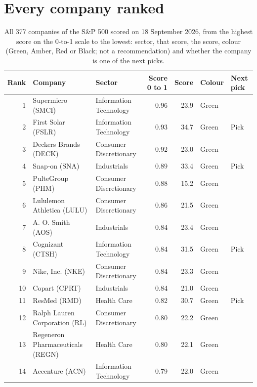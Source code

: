 \documentclass[11pt,a4paper]{article}
\begin{document}
\section{Every company ranked}
\label{app:ranking}
{\small
\begin{longtable}{r p{4.4cm} p{2.8cm} r r l l}
\caption{All 377 companies of the S\&P 500 scored on 18 September 2026, from the highest score on the 0-to-1 scale to the lowest: sector, that score, the score, colour (Green, Amber, Red or Black; not a recommendation) and whether the company is one of the next picks.}\label{tab:ranking}\\
\hline
Rank & Company & Sector & Score 0 to 1 & Score & Colour & Next pick \\
\hline
\endhead
1 & Supermicro (SMCI) & Information Technology & 0.96 & 23.9 & \cellcolor[HTML]{C6EFCE}Green &  \\
2 & First Solar (FSLR) & Information Technology & 0.93 & 34.7 & \cellcolor[HTML]{C6EFCE}Green & Pick \\
3 & Deckers Brands (DECK) & Consumer Discretionary & 0.92 & 23.0 & \cellcolor[HTML]{C6EFCE}Green &  \\
4 & Snap-on (SNA) & Industrials & 0.89 & 33.4 & \cellcolor[HTML]{C6EFCE}Green & Pick \\
5 & PulteGroup (PHM) & Consumer Discretionary & 0.88 & 15.2 & \cellcolor[HTML]{C6EFCE}Green &  \\
6 & Lululemon Athletica (LULU) & Consumer Discretionary & 0.86 & 21.5 & \cellcolor[HTML]{C6EFCE}Green &  \\
7 & A. O. Smith (AOS) & Industrials & 0.84 & 23.4 & \cellcolor[HTML]{C6EFCE}Green &  \\
8 & Cognizant (CTSH) & Information Technology & 0.84 & 31.5 & \cellcolor[HTML]{C6EFCE}Green & Pick \\
9 & Nike, Inc. (NKE) & Consumer Discretionary & 0.84 & 23.3 & \cellcolor[HTML]{C6EFCE}Green &  \\
10 & Copart (CPRT) & Industrials & 0.84 & 21.0 & \cellcolor[HTML]{C6EFCE}Green &  \\
11 & ResMed (RMD) & Health Care & 0.82 & 30.7 & \cellcolor[HTML]{C6EFCE}Green & Pick \\
12 & Ralph Lauren Corporation (RL) & Consumer Discretionary & 0.80 & 22.2 & \cellcolor[HTML]{C6EFCE}Green &  \\
13 & Regeneron Pharmaceuticals (REGN) & Health Care & 0.80 & 22.1 & \cellcolor[HTML]{C6EFCE}Green &  \\
14 & Accenture (ACN) & Information Technology & 0.79 & 22.0 & \cellcolor[HTML]{C6EFCE}Green &  \\

\end{longtable}}
\end{document}
